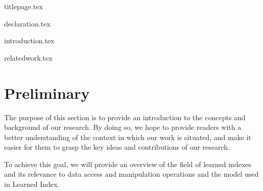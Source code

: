 \documentclass[11pt,a4paper]{article}
\newcommand{\btree}{\textsf{B+tree}\xspace}
\begin{document}
{titlepage.tex}


{declaration.tex}
\clearpage
\listoffigures
\clearpage

\listoftables
\clearpage
\printacronyms


 
\newpage
\tableofcontents


\newpage

{
\centering

\begin{abstract}


The \btree has been the dominant indexing method in database management systems, used by most SQL databases. Recent enhancements take advantage of hardware optimizations such as caching and memory usage. However, the \btree does not make use of existing data patterns and aims to work well for most cases. In contrast, the learned index offers a promising approach to optimizing indexing by leveraging machine learning models to predict the positions of keys and data in the data structure. Initial research on learned index showed significant improvements in search performance and memory consumption compared to traditional \btree. However, the learned index has faced challenges in supporting write operations efficiently. While some approaches have tried to address this issue, they still require overhead for insertion and conflict resolution. This paper proposes a new approach to strategically leaving gaps in the array based on the data distribution and optimizing node creation in the learned index. Results show that our algorithm significantly reduces conflicts and improves read and write operation performance by almost up to $2\times$ compared to the \acrfull{lipp} while also reducing the height of the tree.
\end{abstract}
\newpage
}
{introduction.tex}

{relatedwork.tex}
\section{Preliminary}
The purpose of this section is to provide an introduction to the concepts and background of our research. By doing so, we hope to provide readers with a better understanding of the context in which our work is situated, and make it easier for them to grasp the key ideas and contributions of our research.

To achieve this goal, we will provide an overview of the field of learned indexes and its relevance to data access and manipulation operations and the model used in Learned Index.
\end{document}

